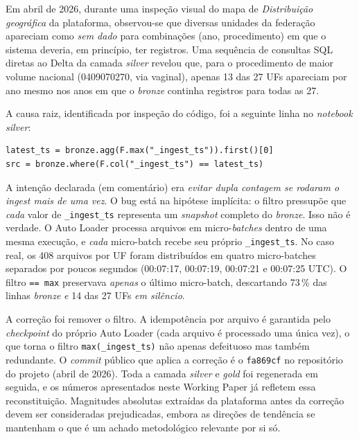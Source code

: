 \documentclass[12pt,a4paper,oneside]{article}
\begin{document}
Em abril de 2026, durante uma inspeção visual do mapa de
\textit{Distribuição geográfica} da plataforma, observou-se que
diversas unidades da federação apareciam como \textit{sem dado}
para combinações (ano, procedimento) em que o sistema deveria, em
princípio, ter registros. Uma sequência de consultas SQL diretas
ao Delta da camada \textit{silver} revelou que, para o procedimento
de maior volume nacional (0409070270, via vaginal), apenas 13 das
27 UFs apareciam por ano \textemdash{} mesmo nos anos em que o
\textit{bronze} continha registros para todas as 27.

\noindent
A causa raiz, identificada por inspeção do código, foi a seguinte
linha no \textit{notebook silver}:

\begin{singlespace}\small
\begin{verbatim}
latest_ts = bronze.agg(F.max("_ingest_ts")).first()[0]
src = bronze.where(F.col("_ingest_ts") == latest_ts)
\end{verbatim}
\end{singlespace}

\noindent
A intenção declarada (em comentário) era \textit{evitar dupla
contagem se rodaram o ingest mais de uma vez}. O bug está na
hipótese implícita: o filtro pressupõe que \textit{cada} valor
de \texttt{\_ingest\_ts} representa um \textit{snapshot} completo
do \textit{bronze}. Isso não é verdade. O Auto Loader processa
arquivos em micro-\textit{batches} dentro de uma mesma execução,
e \textit{cada} micro-batch recebe seu próprio
\texttt{\_ingest\_ts}. No caso real, os 408 arquivos por UF foram
distribuídos em quatro micro-batches separados por poucos segundos
(00:07:17, 00:07:19, 00:07:21 e 00:07:25 UTC). O filtro
\texttt{== max} preservava \textit{apenas} o último micro-batch,
descartando 73\,\% das linhas \textit{bronze} \textit{e} 14 das 27
UFs \textit{em silêncio}.

\noindent
A correção foi remover o filtro. A idempotência por arquivo é
garantida pelo \textit{checkpoint} do próprio Auto Loader (cada
arquivo é processado uma única vez), o que torna o filtro
\texttt{max(\_ingest\_ts)} não apenas defeituoso mas também
redundante. O \textit{commit} público que aplica a correção é o
\texttt{fa869cf} no repositório do projeto (abril de 2026). Toda a
camada \textit{silver} e \textit{gold} foi regenerada em seguida,
e os números apresentados neste Working Paper já refletem essa
reconstituição. Magnitudes absolutas extraídas da plataforma antes
da correção devem ser consideradas prejudicadas, embora as direções
de tendência se mantenham \textemdash{} o que é um achado
metodológico relevante por si só.
\end{document}
